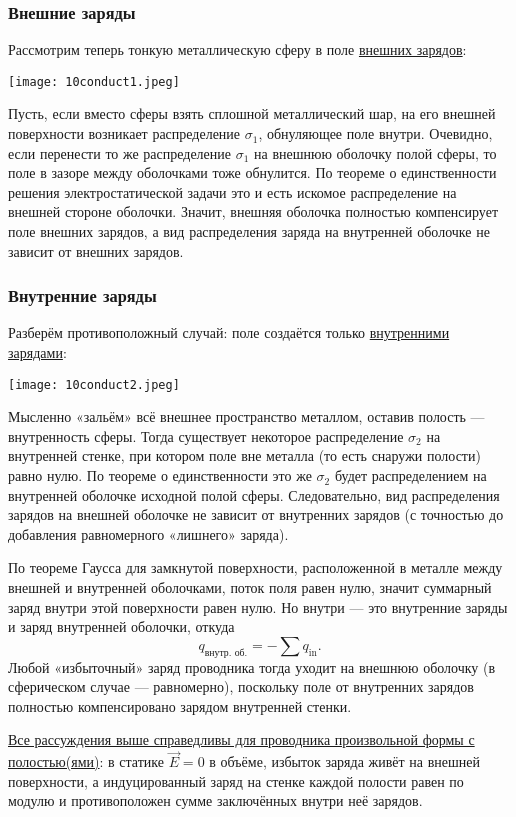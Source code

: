 \documentclass[12pt, a4paper]{article}%
\begin{document}
\subsubsection*{Внешние заряды}

Рассмотрим теперь тонкую металлическую сферу в поле \underline{внешних зарядов}:

\begin{center}
\texttt{[image: 10conduct1.jpeg]}
\label{fig:mpr}
\end{center}

Пусть, если вместо сферы взять сплошной металлический шар, на его внешней поверхности возникает распределение $\sigma_1$, обнуляющее поле внутри. Очевидно, если перенести то же распределение $\sigma_1$ на внешнюю оболочку полой сферы, то поле в зазоре между оболочками тоже обнулится. По теореме о единственности решения электростатической задачи это и есть искомое распределение на внешней стороне оболочки. Значит, внешняя оболочка полностью компенсирует поле внешних зарядов, а вид распределения заряда на внутренней оболочке не зависит от внешних зарядов.

\subsubsection*{Внутренние заряды}

Разберём противоположный случай: поле создаётся только \underline{внутренними зарядами}:

\begin{center}
\texttt{[image: 10conduct2.jpeg]}
\label{fig:mpr}
\end{center}

Мысленно «зальём» всё внешнее пространство металлом, оставив полость — внутренность сферы. Тогда существует некоторое распределение $\sigma_2$ на внутренней стенке, при котором поле вне металла (то есть снаружи полости) равно нулю. По теореме о единственности это же $\sigma_2$ будет распределением на внутренней оболочке исходной полой сферы. Следовательно, вид распределения зарядов на внешней оболочке не зависит от внутренних зарядов (с точностью до добавления равномерного «лишнего» заряда).



По теореме Гаусса для замкнутой поверхности, расположенной в металле между внешней и внутренней оболочками, поток поля равен нулю, значит суммарный заряд внутри этой поверхности равен нулю. Но внутри — это внутренние заряды и заряд внутренней оболочки, откуда
\[
q_{\text{внутр. об.}} = - \sum q_{\text{in}}.
\]
Любой «избыточный» заряд проводника тогда уходит на внешнюю оболочку (в сферическом случае — равномерно), поскольку поле от внутренних зарядов полностью компенсировано зарядом внутренней стенки.

\underline{Все рассуждения выше справедливы для проводника произвольной формы с полостью(ями)}: в статике $ \vec E=0 $ в объёме, избыток заряда живёт на внешней поверхности, а индуцированный заряд на стенке каждой полости равен по модулю и противоположен сумме заключённых внутри неё зарядов.
 
\end{document}

